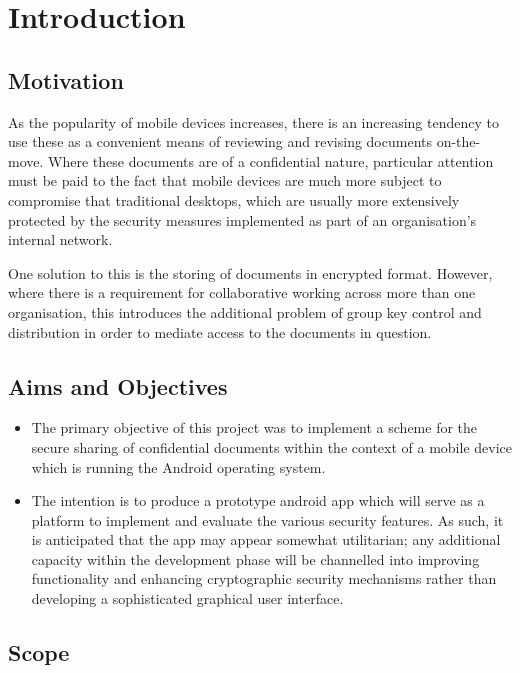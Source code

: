 
\chapter{Introduction}
\label{cha:introduction}
\section{Motivation}
\label{sec:motivation}
As the popularity of mobile devices increases, there is an increasing tendency to use these as a convenient means of reviewing and revising documents on-the-move. Where these documents are of a confidential nature, particular attention must be paid to the fact that mobile devices are much more subject to compromise that traditional desktops, which are usually more extensively protected by the security measures implemented as part of an organisation's internal network. 

One solution to this is the storing of documents in encrypted format. However, where there is a requirement for collaborative working across more than one organisation, this introduces the additional problem of group key control and distribution in order to mediate access to the documents in question.

\section{Aims and Objectives}
\label{sec:aims-obj}

\begin{itemize}
\item The primary objective of this project was to implement a scheme for the secure sharing of confidential documents within the context of a mobile device which is running the Android operating system.


\item The intention is to produce a prototype android app which will serve as a platform to implement and evaluate the various security features. As such, it is anticipated that the app may appear somewhat utilitarian; any additional capacity within the development phase will be channelled into improving functionality and enhancing cryptographic security mechanisms rather than developing a sophisticated graphical user interface.
\end{itemize}

\section{Scope}
\label{sec:scope}


